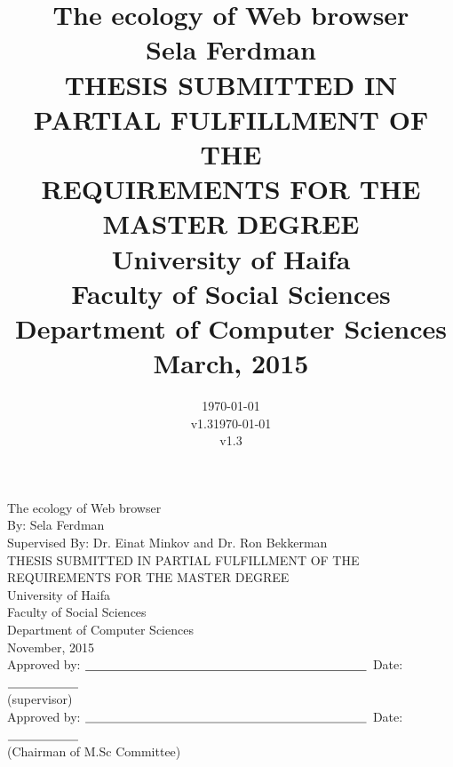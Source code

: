 \documentclass[11pt,oneside]{book}
\newcommand{\bigspace}{\mbox{\hspace{10mm}}}
\begin{document}
\date{\today\\v1.3}
\title{\Huge{The ecology of Web browser}
                \huge
             \\[10mm] Sela Ferdman
             \\[25mm] \Large THESIS SUBMITTED IN PARTIAL FULFILLMENT OF THE
             \\       REQUIREMENTS FOR THE MASTER DEGREE
             \\[15mm] University of Haifa
             \\       Faculty of Social Sciences
             \\       Department of Computer Sciences
             \\[10mm] March, 2015
}
\date{\today\\v1.3}
\maketitle{}

\pagestyle{plain}

\begin{center}
\Huge
     The ecology of Web browser
\huge
\\[10mm] By: Sela Ferdman
\\[3mm] Supervised By: Dr. Einat Minkov and Dr. Ron Bekkerman
\Large
\\ [10mm]THESIS SUBMITTED IN PARTIAL FULFILLMENT OF THE
\\ REQUIREMENTS FOR THE MASTER DEGREE
\\ [10mm]University of Haifa
\\ [1mm]Faculty of Social Sciences
\\ [1mm]Department of Computer Sciences
\\ [3mm]November, 2015
\\ [8mm] Approved by:
$\underline{\bigspace\bigspace\bigspace\bigspace\bigspace\bigspace\bigspace\bigspace}$
   \bigspace    Date:$\underline{\bigspace\bigspace}$
\\ (supervisor)\bigspace
\\ [3mm]Approved by:
$\underline{\bigspace\bigspace\bigspace\bigspace\bigspace\bigspace\bigspace\bigspace}$
   \bigspace    Date:$\underline{\bigspace\bigspace}$
\\ (Chairman of  M.Sc Committee) \bigspace

\end{center}

\end{document}
